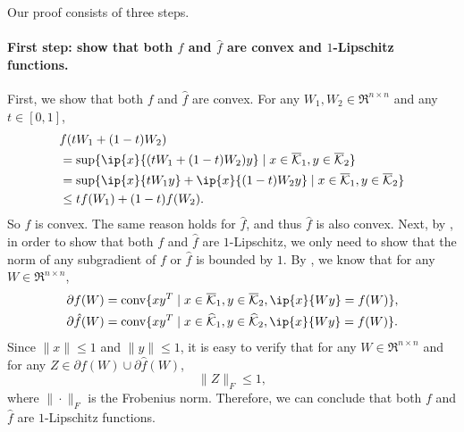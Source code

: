 Our proof consists of three steps. 

\paragraph{First step: show that both $f$ and $\hat f$ are convex and $1$-Lipschitz functions.} First, we show that both $f$ and $\hat f$ are convex. 
For any $W_1, W_2 \in \Re^{n\times n}$ and any $t \in [0,1]$, 
\begin{align*}
  &f(tW_1 + (1-t)W_2) 
  \\&= \sup\{\ip{x}{(tW_1 + (1-t)W_2)y} \mid x \in \overline\Kscr_1, y \in\overline\Kscr_2\}
  \\&= \sup\{\ip{x}{tW_1y} + \ip{x}{(1-t)W_2y} \mid x \in \overline\Kscr_1, y \in\overline\Kscr_2\}
  \\&\leq tf(W_1) + (1-t)f(W_2).
\end{align*}
So $f$ is convex. The same reason holds for $\hat f$, and thus $\hat f$ is also convex. 
Next, by \cite[Lemma~2.6]{shalev2011online}, in order to show that both $f$ and $\hat f$ are $1$-Lipschitz, we only need to show that the norm of any subgradient of $f$ or $\hat f$ is bounded by $1$. By \cite[Theorem~D.4.4.2]{hiriart-urruty01}, we know that for any $W \in \Re^{n\times n}$, 
\begin{align*}
  \partial f(W) &= \conv\{xy^T \mid x \in \overline\Kscr_1, y \in\overline\Kscr_2, \ip{x}{Wy} = f(W)\},
  \\ \partial \hat f(W) &= \conv\{xy^T \mid x \in \widehat\Kscr_1, y \in\widehat\Kscr_2, \ip{x}{Wy} = f(W)\}.
\end{align*}
Since $\|x\| \leq 1$ and $\|y\| \leq 1$, it is easy to verify that for any $W\in\Re^{n\times n}$ and for any $Z \in \partial f(W) \cup \partial \hat f(W)$, 
\[\|Z\|_F \leq 1,\]
where $\|\cdot\|_F$ is the Frobenius norm. Therefore, we can conclude that both $f$ and $\hat f$ are $1$-Lipschitz functions.


